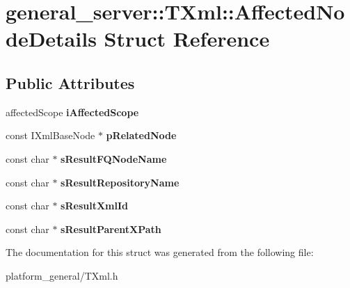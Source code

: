\hypertarget{structgeneral__server_1_1TXml_1_1AffectedNodeDetails}{\section{general\-\_\-server\-:\-:\-T\-Xml\-:\-:\-Affected\-Node\-Details \-Struct \-Reference}
\label{structgeneral__server_1_1TXml_1_1AffectedNodeDetails}
}
\subsection*{\-Public \-Attributes}
\begin{DoxyCompactItemize}
\item 
\hypertarget{structgeneral__server_1_1TXml_1_1AffectedNodeDetails_ad18708d3a3ffab7ff69c5ca623337988}{affected\-Scope {\bfseries i\-Affected\-Scope}}\label{structgeneral__server_1_1TXml_1_1AffectedNodeDetails_ad18708d3a3ffab7ff69c5ca623337988}

\item 
\hypertarget{structgeneral__server_1_1TXml_1_1AffectedNodeDetails_ae16d5d4c0835c0b97b313cf0dd897af3}{const \-I\-Xml\-Base\-Node $\ast$ {\bfseries p\-Related\-Node}}\label{structgeneral__server_1_1TXml_1_1AffectedNodeDetails_ae16d5d4c0835c0b97b313cf0dd897af3}

\item 
\hypertarget{structgeneral__server_1_1TXml_1_1AffectedNodeDetails_add3c13151f81ecb18b05c64d0347c4e1}{const char $\ast$ {\bfseries s\-Result\-F\-Q\-Node\-Name}}\label{structgeneral__server_1_1TXml_1_1AffectedNodeDetails_add3c13151f81ecb18b05c64d0347c4e1}

\item 
\hypertarget{structgeneral__server_1_1TXml_1_1AffectedNodeDetails_aef5143422819b195d7269de0a9be46d0}{const char $\ast$ {\bfseries s\-Result\-Repository\-Name}}\label{structgeneral__server_1_1TXml_1_1AffectedNodeDetails_aef5143422819b195d7269de0a9be46d0}

\item 
\hypertarget{structgeneral__server_1_1TXml_1_1AffectedNodeDetails_ad9ed3aa84a60bc730d34770a2735c322}{const char $\ast$ {\bfseries s\-Result\-Xml\-Id}}\label{structgeneral__server_1_1TXml_1_1AffectedNodeDetails_ad9ed3aa84a60bc730d34770a2735c322}

\item 
\hypertarget{structgeneral__server_1_1TXml_1_1AffectedNodeDetails_aea17efd25e230577ae17b8430361ea98}{const char $\ast$ {\bfseries s\-Result\-Parent\-X\-Path}}\label{structgeneral__server_1_1TXml_1_1AffectedNodeDetails_aea17efd25e230577ae17b8430361ea98}

\end{DoxyCompactItemize}


\-The documentation for this struct was generated from the following file\-:\begin{DoxyCompactItemize}
\item 
platform\-\_\-general/\-T\-Xml.\-h\end{DoxyCompactItemize}
